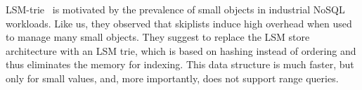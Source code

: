 LSM-trie~\cite{Wu2015} is motivated by the prevalence of small objects in industrial NoSQL workloads.  
Like us, they observed that skiplists induce high overhead when used to manage many small objects.  
They suggest to replace the LSM store architecture with an LSM trie, which is based on hashing instead of ordering 
and thus eliminates the memory for indexing. This data structure is much faster, but only for small values, and, more importantly, does not
support range queries.

